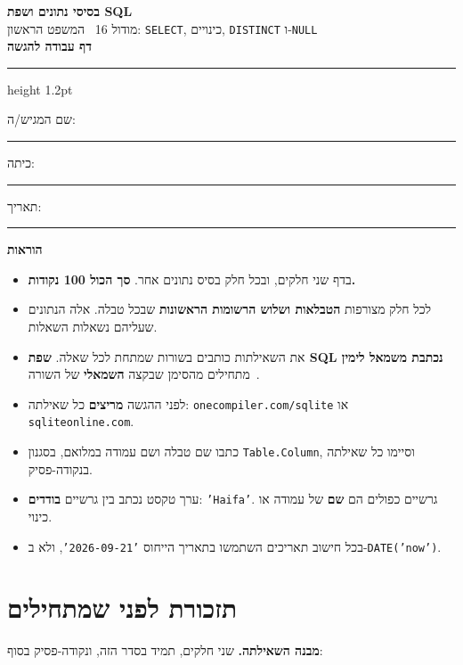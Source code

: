 \documentclass[11pt,a4paper]{article}
\newenvironment{panel}{\par\addvspace{7pt}\begin{lrbox}{\panelbox}%
  \begin{minipage}{\dimexpr\linewidth-2\fboxsep-2\fboxrule}}%
  {\end{minipage}\end{lrbox}\noindent\fcolorbox{rulegray}{boxgray}{\usebox{\panelbox}}\par\addvspace{7pt}}
\begin{document}
\begin{center}
{\LARGE\bfseries\color{inkblue} בסיסי נתונים ושפת SQL}\\[2pt]
{\large מודול 16 \textendash\ המשפט הראשון: \texttt{SELECT}, כינויים, \texttt{DISTINCT} ו-\texttt{NULL}}\\[6pt]
{\large\bfseries דף עבודה להגשה}
\end{center}
\vspace{2pt}
{\color{inkblue}\hrule height 1.2pt}
\vspace{6pt}

\noindent שם המגיש/ה:~\rule{5.2cm}{0.4pt}\hfill כיתה:~\rule{2.2cm}{0.4pt}\hfill תאריך:~\rule{3cm}{0.4pt}
\vspace{8pt}

\begin{panel}
\textbf{הוראות}
\begin{itemize}[leftmargin=1.2em, itemsep=1pt, topsep=3pt]
  \item בדף שני חלקים, ובכל חלק בסיס נתונים אחר. \textbf{סך הכול 100 נקודות.}
  \item לכל חלק מצורפות \textbf{הטבלאות ושלוש הרשומות הראשונות} שבכל טבלה. אלה הנתונים שעליהם נשאלות השאלות.
  \item את השאילתות כותבים בשורות שמתחת לכל שאלה. \textbf{שפת SQL נכתבת משמאל לימין} \textendash\ מתחילים מהסימן שבקצה \textbf{השמאלי} של השורה.
  \item לפני ההגשה \textbf{מריצים} כל שאילתה: \texttt{onecompiler.com/sqlite} או \texttt{sqliteonline.com}.
  \item כתבו שם טבלה ושם עמודה במלואם, בסגנון \texttt{Table.Column}, וסיימו כל שאילתה בנקודה-פסיק.
  \item ערך טקסט נכתב בין גרשיים \textbf{בודדים}: \texttt{'Haifa'}. גרשיים כפולים הם \textbf{שם} של עמודה או כינוי.
  \item בכל חישוב תאריכים השתמשו בתאריך הייחוס \texttt{'2026-09-21'}, ולא ב-\texttt{DATE('now')}.
\end{itemize}
\end{panel}


\vspace{10pt}
\section*{תזכורת לפני שמתחילים}
\vspace{6pt}

\textbf{מבנה השאילתה.} שני חלקים, תמיד בסדר הזה, ונקודה-פסיק בסוף:
\end{document}
